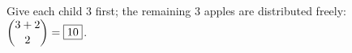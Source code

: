 Give each child $3$ first; the remaining $3$ apples are distributed freely: $\dbinom{3+2}2=\boxed{10}$.
